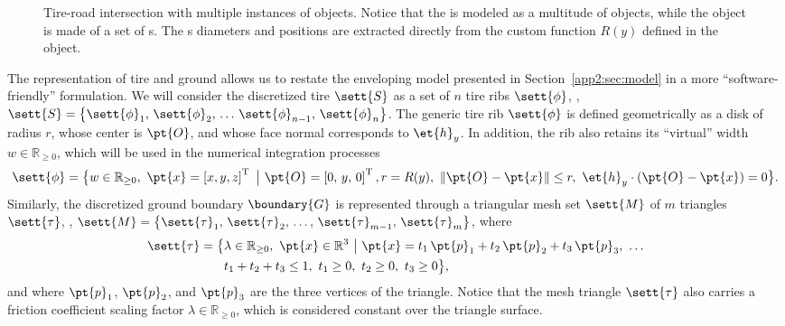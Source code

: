 \begin{figure}[htb]
  \centering
  \def\svgwidth{0.5\textwidth}
  
  \caption{Tire-road intersection with multiple instances of \Shell{} objects. Notice that the \Mesh{} is modeled as a multitude of \TriangleGround{} objects, while the \Shell{} object is made of a set of \Rib{}s. The \Rib{}s diameters and positions are extracted directly from the custom function $R(y)$ defined in the \Shape{} object.}
  \label{app2:fig:tire_zoom}
\end{figure}

The representation of tire and ground allows us to restate the enveloping model presented in Section~\ref{app2:sec:model} in a more ``software-friendly'' formulation. We will consider the discretized tire $\sett{S}$ as a set of $n$ tire ribs $\sett{\phi}$, \ie{}, $\sett{S} = \big\{ \sett{\phi}_1, \, \sett{\phi}_2, \, \dots \, \sett{\phi}_{n-1}, \, \sett{\phi}_{n}\big\}$. The generic tire rib $\sett{\phi}$ is defined geometrically as a disk of radius $r$, whose center is $\pt{O}$, and whose face normal corresponds to $\et{h}_y$. In addition, the rib also retains its ``virtual'' width $w \in \mathbb{R}_{\geq 0}$, which will be used in the numerical integration processes
%
\begin{equation}
  \sett{\phi} = \big\{ w \in \mathbb{R}_{\geq 0}, ~ \pt{x} = \left[x, y, z\right]^\mathrm{T} ~ \big\lvert ~ \pt{O} = \left[0, \, y, \, 0\right]^\mathrm{T}, r = R(y), ~ \|\pt{O} - \pt{x}\| \leq r, ~ \et{h}_y \cdot (\pt{O} - \pt{x}) = 0\big\} \text{.}
      \label{app2:eq:rib}
\end{equation}
%
Similarly, the discretized ground boundary $\boundary{G}$ is represented through a triangular mesh set $\sett{M}$ of $m$ triangles $\sett{\tau}$, \ie{}, $\sett{M} = \big\{ \sett{\tau}_1, \, \sett{\tau}_2, \, \dots, \, \sett{\tau}_{m-1}, \, \sett{\tau}_m \big\}$, where
%
\begin{equation}
  \begin{split}
    \begin{aligned}
      \sett{\tau} = \big\{ & \lambda\in\mathbb{R}_{\geq 0}, ~ \pt{x}\in\mathbb{R}^3 ~ \big\lvert ~ \pt{x} = t_1\,\pt{p}_1 + t_2\,\pt{p}_2 + t_3\,\pt{p}_3, ~ \dots \\
      &t_1 + t_2 + t_3 \leq 1, ~ t_1\geq 0, ~ t_2\geq 0, ~ t_3\geq 0\big\}\text{,}
    \end{aligned}
  \end{split}
  \label{app2:eq:triangleground}
\end{equation}
%
and where $\pt{p}_1$, $\pt{p}_2$, and $\pt{p}_3$ are the three vertices of the triangle. Notice that the mesh triangle $\sett{\tau}$ also carries a friction coefficient scaling factor $\lambda\in\mathbb{R}_{\geq 0}$, which is considered constant over the triangle surface.

